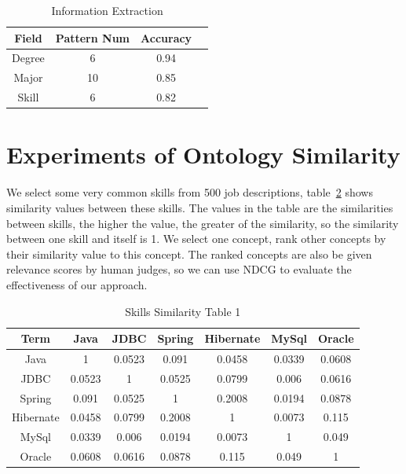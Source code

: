 \begin{table}[ht]
\caption{Information Extraction} %
\centering %
\begin{tabular}{   | c | c | c | c |   }
 \hline
                     Field   & Pattern Num & Accuracy     \\
 \hline
                     Degree & 6         & 0.94         \\
 \hline
                     Major  & 10        & 0.85      \\
 \hline
                     Skill  & 6         & 0.82      \\
 \hline
\end{tabular}
\label{tab:ieaccura} %
\end{table}

\section{Experiments of Ontology Similarity}

We select some very common skills from 500 job descriptions, table~\ref{tab:dismatrix3} shows similarity values between these skills. The values in the table are the similarities between skills, the higher the value, the greater of the similarity, so the similarity between one skill and itself is 1. We select one concept, rank other concepts by their similarity value to this concept. The ranked concepts are also be given relevance scores by human judges, so we can use NDCG to evaluate the effectiveness of our approach.

\begin{table}

\caption{Skills Similarity Table 1}
\begin{tabular}{ c | c c c c c c   }
 \hline
  Term       &  Java  &  JDBC  & Spring & Hibernate & MySql  & Oracle   \\  \hline
  Java   &   1    & 0.0523 & 0.091  &   0.0458  & 0.0339 & 0.0608    \\  \hline
    JDBC   & 0.0523 &   1    & 0.0525 &   0.0799  & 0.006  & 0.0616   \\  \hline
   Spring  & 0.091  & 0.0525 &   1    &   0.2008  & 0.0194 & 0.0878   \\  \hline
 Hibernate & 0.0458 & 0.0799 & 0.2008 &     1     & 0.0073 & 0.115    \\  \hline
   MySql   & 0.0339 & 0.006  & 0.0194 &   0.0073  &   1    & 0.049    \\  \hline
   Oracle  & 0.0608 & 0.0616 & 0.0878 &   0.115   & 0.049  &   1      \\  \hline
 \hline
\end{tabular}
\label{tab:dismatrix3}
\end{table}

